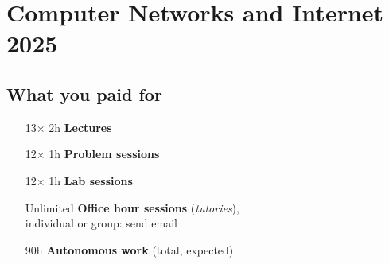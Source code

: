 

\chapter{Computer Networks and Internet 2025}\label{sec:course}

\section{What you paid for}
\vspace{-0.5cm}
\CellHeight{.5in}
\CellWidth{1in}
\TextSize{\normalsize\centering}
\FiveDay
{}
\begin{schedule}
\end{schedule}

\begin{center}
\begin{minipage}{0.5\linewidth}
\begin{itemize}
 \item[13$\times$] 2h {\color{color1}\textbf{Lectures}}
 \item[12$\times$] 1h {\color{color1}\textbf{Problem sessions}}
 \item[12$\times$] 1h {\color{color2}\textbf{Lab sessions}}
 \item[Unlimited] \textbf{\color{darkgray}Office hour sessions} (\textit{tutories}),\\individual or group: send email
 \item[90h] {\textbf{\color{gray}Autonomous work} (total, expected)}
\end{itemize}
\end{minipage}
\end{center}

